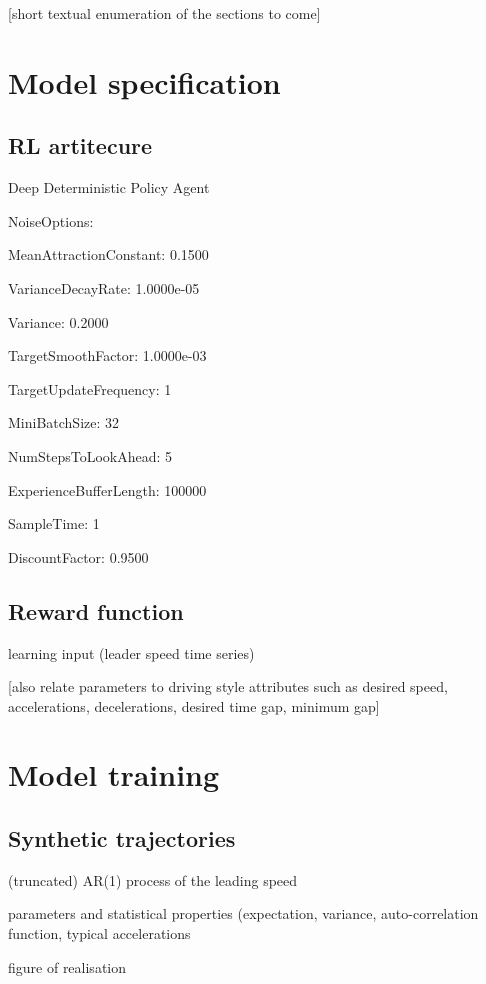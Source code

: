 \documentclass[review]{elsarticle}
\begin{document}
[short textual enumeration of the sections to come]

\section{Model specification}

\subsection{RL artitecure}
Deep Deterministic Policy Agent

NoiseOptions:    


MeanAttractionConstant: 0.1500

VarianceDecayRate: 1.0000e-05

Variance: 0.2000

TargetSmoothFactor: 1.0000e-03

TargetUpdateFrequency: 1

MiniBatchSize: 32

NumStepsToLookAhead: 5

ExperienceBufferLength: 100000

SampleTime: 1

DiscountFactor: 0.9500

\subsection{Reward function}

learning input (leader speed time series)

[also relate parameters to driving style attributes such as desired
speed, accelerations, decelerations, desired time gap, minimum gap]


\section{Model training}

\subsection{Synthetic trajectories}

(truncated) AR(1) process of the leading speed

parameters and statistical properties (expectation, variance, auto-correlation
function, typical accelerations

figure of realisation
\end{document}
